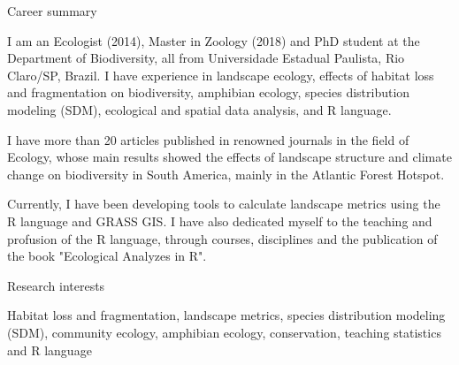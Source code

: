 \documentclass{resume}
\begin{document}

\begin{rSection}{Career summary}

I am an Ecologist (2014), Master in Zoology (2018) and PhD student at the Department of Biodiversity, all from Universidade Estadual Paulista, Rio Claro/SP, Brazil. I have experience in landscape ecology, effects of habitat loss and fragmentation on biodiversity, amphibian ecology, species distribution modeling (SDM), ecological and spatial data analysis, and R language. 

I have more than 20 articles published in renowned journals in the field of Ecology, whose main results showed the effects of landscape structure and climate change on biodiversity in South America, mainly in the Atlantic Forest Hotspot. 

Currently, I have been developing tools to calculate landscape metrics using the R language and GRASS GIS. I have also dedicated myself to the teaching and profusion of the R language, through courses, disciplines and the publication of the book "Ecological Analyzes in R".

\end{rSection}


\begin{rSection}{Research interests}

Habitat loss and fragmentation, landscape metrics, species distribution modeling (SDM), community ecology, amphibian ecology, conservation, teaching statistics and R language

\end{rSection}

\end{document}
